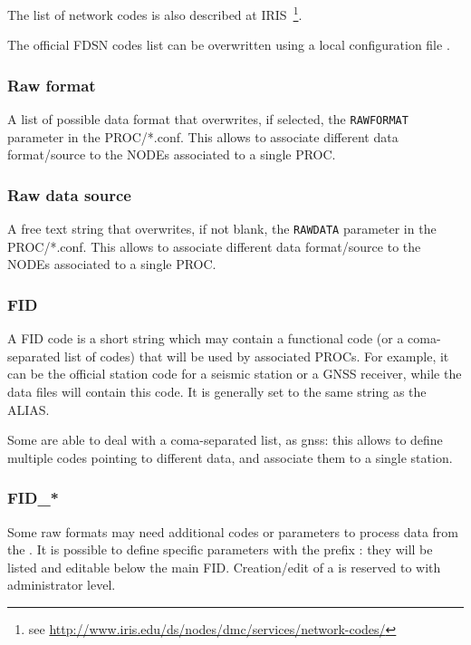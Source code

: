 The list of network codes is also described at IRIS~\footnote{see \url{http://www.iris.edu/ds/nodes/dmc/services/network-codes/}}.

The official FDSN codes list can be overwritten using a local configuration file .

\subsubsection{Raw format}

A list of possible data format that overwrites, if selected, the \texttt{RAWFORMAT} parameter in the PROC/*.conf. This allows to associate different data format/source to the NODEs associated to a single PROC.


\subsubsection{Raw data source}

A free text string that overwrites, if not blank, the \texttt{RAWDATA} parameter in the PROC/*.conf. This allows to associate different data format/source to the NODEs associated to a single PROC.


\subsubsection{FID}

A FID code is a short string which may contain a functional code (or a coma-separated list of codes) that will be used by associated PROCs. For example, it can be the official station code for a seismic station or a GNSS receiver, while the data files will contain this code. It is generally set to the same string as the ALIAS.

Some  are able to deal with a coma-separated list, as gnss: this allows to define multiple codes pointing to different data, and associate them to a single station.

\subsubsection{FID\_*}

Some raw formats may need additional codes or parameters to process data from the . It is possible to define specific parameters with the prefix : they will be listed and editable below the main FID. Creation/edit of a  is reserved to  with administrator level.


